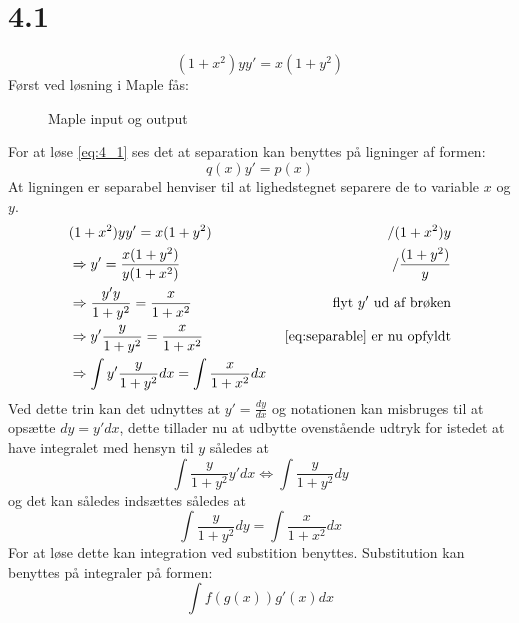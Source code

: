 \documentclass[11pt, fleqn]{article}
\begin{document}

\maketitle %
\section*{4.1}

\begin{equation}
\label{eq:4_1}
(1+x^2)yy'=x(1+y^2)
\end{equation}
Først ved løsning i Maple fås:
\begin{figure}[H]
\caption{Maple input og output}
\begin{center}

%
\end{center}
\end{figure}
For at løse \eqref{eq:4_1} ses det at separation kan benyttes på ligninger af formen:
\begin{equation}
\label{eq:separable}
q(x)y'=p(x)
\end{equation}
At ligningen er separabel henviser til at lighedstegnet separere de to variable $x$ og $y$.
\begin{align*}
& (1+x^2)yy'=x(1+y^2) & /(1+x^2)y\\
& \Rightarrow  y'=\frac{x(1+y^2)}{y(1+x^2)} & /\frac{(1+y^2)}{y} \\
& \Rightarrow \frac{y'y}{1+y^2}=\frac{x}{1+x^2} & \text{ flyt } y' \text{ ud af brøken} \\
& \Rightarrow y'\frac{y}{1+y^2}=\frac{x}{1+x^2} & \text{ \eqref{eq:separable} er nu opfyldt} \\
& \Rightarrow \int y'\frac{y}{1+y^2} dx=\int \frac{x}{1+x^2}dx
\end{align*}
Ved dette trin kan det udnyttes at $y'=\frac{dy}{dx}$ og notationen kan misbruges til at opsætte $dy=y'dx$, dette tillader nu at udbytte ovenstående udtryk for istedet at have integralet med hensyn til $y$ således at
\[
\int\frac{y}{1+y^2}y'dx\Leftrightarrow \int \frac{y}{1+y^2} dy
\]
og det kan således indsættes således at 
\[
\int \frac{y}{1+y^2} dy = \int \frac{x}{1+x^2}dx
\]
For at løse dette kan integration ved substition benyttes. Substitution kan benyttes på integraler på formen:
\begin{equation}
\label{eq:substitution}
\int f(g(x))g'(x)dx
\end{equation}
\end{document}
